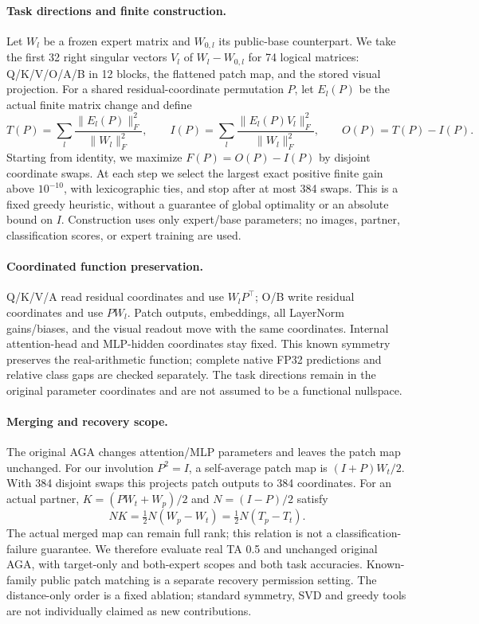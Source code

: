 \paragraph{Task directions and finite construction.}
Let $W_l$ be a frozen expert matrix and $W_{0,l}$ its public-base counterpart.
We take the first 32 right singular vectors $V_l$ of $W_l-W_{0,l}$ for 74 logical matrices:
Q/K/V/O/A/B in 12 blocks, the flattened patch map, and the stored visual projection.
For a shared residual-coordinate permutation $P$, let $E_l(P)$ be the actual finite matrix change and define
\[
 T(P)=\sum_l\frac{\lVert E_l(P)\rVert_F^2}{\lVert W_l\rVert_F^2},\qquad
 I(P)=\sum_l\frac{\lVert E_l(P)V_l\rVert_F^2}{\lVert W_l\rVert_F^2},\qquad
 O(P)=T(P)-I(P).
\]
Starting from identity, we maximize $F(P)=O(P)-I(P)$ by disjoint coordinate swaps.
At each step we select the largest exact positive finite gain above $10^{-10}$,
with lexicographic ties, and stop after at most 384 swaps.
This is a fixed greedy heuristic, without a guarantee of global optimality or an absolute bound on $I$.
Construction uses only expert/base parameters; no images, partner, classification scores, or expert training are used.

\paragraph{Coordinated function preservation.}
Q/K/V/A read residual coordinates and use $W_lP^\top$; O/B write residual coordinates and use $PW_l$.
Patch outputs, embeddings, all LayerNorm gains/biases, and the visual readout move with the same coordinates.
Internal attention-head and MLP-hidden coordinates stay fixed.
This known symmetry preserves the real-arithmetic function; complete native FP32 predictions and relative class gaps are checked separately.
The task directions remain in the original parameter coordinates and are not assumed to be a functional nullspace.

\paragraph{Merging and recovery scope.}
The original AGA changes attention/MLP parameters and leaves the patch map unchanged.
For our involution $P^2=I$, a self-average patch map is $(I+P)W_t/2$.
With 384 disjoint swaps this projects patch outputs to 384 coordinates.
For an actual partner, $K=(PW_t+W_p)/2$ and $N=(I-P)/2$ satisfy
\[
 NK=\tfrac12N(W_p-W_t)=\tfrac12N(T_p-T_t).
\]
The actual merged map can remain full rank; this relation is not a classification-failure guarantee.
We therefore evaluate real TA 0.5 and unchanged original AGA, with target-only and both-expert scopes and both task accuracies.
Known-family public patch matching is a separate recovery permission setting.
The distance-only order is a fixed ablation; standard symmetry, SVD and greedy tools are not individually claimed as new contributions.
